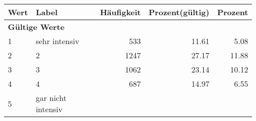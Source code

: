      \begin{longtable}{lXrrr}
     \toprule
     \textbf{Wert} & \textbf{Label} & \textbf{Häufigkeit} & \textbf{Prozent(gültig)} & \textbf{Prozent} \\
     \endhead
     \midrule
     \multicolumn{5}{l}{\textbf{Gültige Werte}}\\

     1 &
     \multicolumn{1}{X}{ sehr intensiv   } &


       \num{533} &
       \num[round-mode=places,round-precision=2]{11.61} &
         \num[round-mode=places,round-precision=2]{5.08} \\

     2 &
     \multicolumn{1}{X}{ 2   } &


       \num{1247} &
       \num[round-mode=places,round-precision=2]{27.17} &
         \num[round-mode=places,round-precision=2]{11.88} \\

     3 &
     \multicolumn{1}{X}{ 3   } &


       \num{1062} &
       \num[round-mode=places,round-precision=2]{23.14} &
         \num[round-mode=places,round-precision=2]{10.12} \\

     4 &
     \multicolumn{1}{X}{ 4   } &


       \num{687} &
       \num[round-mode=places,round-precision=2]{14.97} &
         \num[round-mode=places,round-precision=2]{6.55} \\

     5 &
     \multicolumn{1}{X}{ gar nicht intensiv   } &



\end{longtable}
